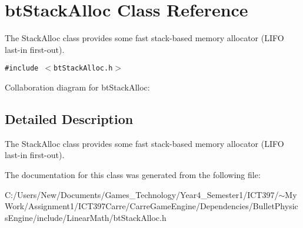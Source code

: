 \hypertarget{classbt_stack_alloc}{
\section{btStackAlloc Class Reference}
\label{classbt_stack_alloc}
}
The StackAlloc class provides some fast stack-based memory allocator (LIFO last-in first-out).  


{\tt \#include $<$btStackAlloc.h$>$}

Collaboration diagram for btStackAlloc:

\subsection{Detailed Description}
The StackAlloc class provides some fast stack-based memory allocator (LIFO last-in first-out). 

The documentation for this class was generated from the following file:\begin{CompactItemize}
\item 
C:/Users/New/Documents/Games\_\-Technology/Year4\_\-Semester1/ICT397/$\sim$My Work/Assignment1/ICT397Carre/CarreGameEngine/Dependencies/BulletPhysicsEngine/include/LinearMath/btStackAlloc.h\end{CompactItemize}
